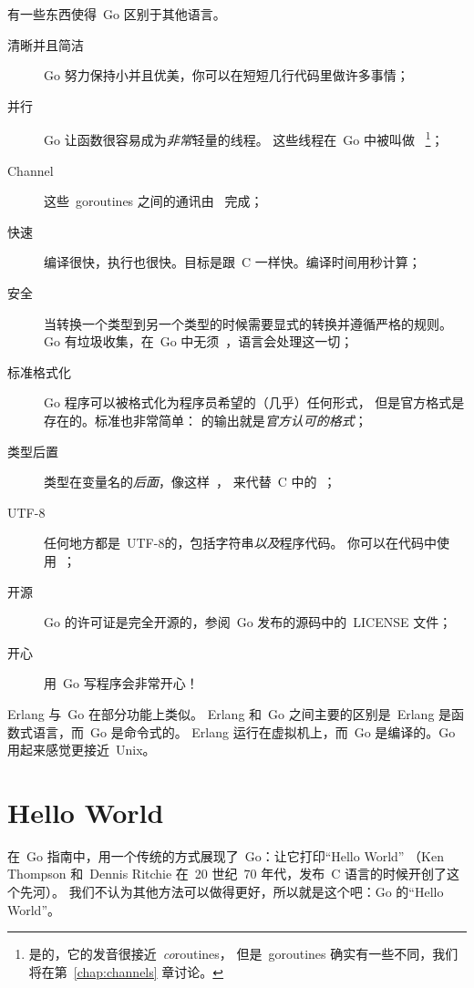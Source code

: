 \noindent{}有一些东西使得~Go 区别于其他语言。
\begin{description}
\item[清晰并且简洁]
Go 努力保持小并且优美，你可以在短短几行代码里做许多事情；

\item[并行]
Go 让函数很容易成为\emph{非常}轻量的线程。
这些线程在~Go 中被叫做~ 
\footnote{是的，它的发音很接近~\emph{co}routines，
但是~goroutines 确实有一些不同，我们将在第~\ref{chap:channels} 章讨论。}；
\item[Channel]
这些~goroutines 之间的通讯由~\cite{hoare, csp} 完成；

\item[快速]
编译很快，执行也很快。目标是跟~C 一样快。编译时间用秒计算；

\item[安全]
当转换一个类型到另一个类型的时候需要显式的转换并遵循严格的规则。
Go 有垃圾收集，在~Go 中无须~，语言会处理这一切；

\item[标准格式化]
Go 程序可以被格式化为程序员希望的（几乎）任何形式，
但是官方格式是存在的。标准也非常简单：
 的输出就是\emph{官方认可的格式}；

\item[类型后置]
类型在变量名的\emph{后面}，像这样~，
来代替~C 中的~；

\item[UTF-8]
任何地方都是~UTF-8的，包括字符串\emph{以及}程序代码。 
你可以在代码中使用~；

\item[开源]
Go 的许可证是完全开源的，参阅~Go 发布的源码中的~LICENSE 文件；

\item[开心]
用~Go 写程序会非常开心！

\end{description}
Erlang\cite{erlang} 与~Go 在部分功能上类似。
Erlang 和~Go 之间主要的区别是~Erlang 是函数式语言，而~Go 是命令式的。
Erlang 运行在虚拟机上，而~Go 是编译的。Go 用起来感觉更接近~Unix。

\section{Hello World}
\label{sec:hello world}
在~Go 指南中，用一个传统的方式展现了~Go：让它打印``Hello World''
（Ken Thompson 和~Dennis Ritchie 在~20 世纪~70 年代，发布~C 语言的时候开创了这个先河）。
我们不认为其他方法可以做得更好，所以就是这个吧：Go 的``Hello World''。

